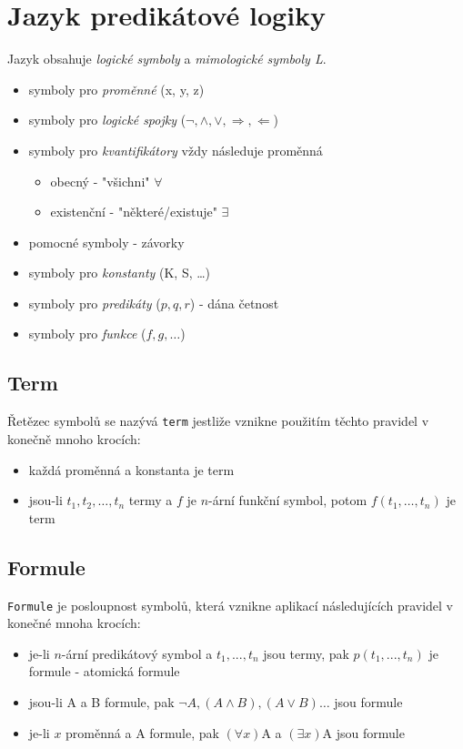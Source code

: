 \documentclass{szzclass}
\begin{document}
\tableofcontents
\newpage

\section{Jazyk predikátové logiky}
Jazyk obsahuje \textit{logické symboly} a \textit{mimologické symboly L}.
\begin{itemize}
  \item symboly pro \textit{proměnné} (x, y, z)
  \item symboly pro \textit{logické spojky} ($\neg, \wedge, \vee, \Rightarrow, \Leftarrow$)
  \item symboly pro \textit{kvantifikátory} vždy následuje proměnná
  \begin{itemize}
    \item obecný - "všichni" $\forall$
    \item existenční - "některé/existuje" $\exists$
  \end{itemize}
  \item pomocné symboly - závorky
  \item symboly pro \textit{konstanty} (K, S, \dots)
  \item symboly pro \textit{predikáty} ($p, q, r$) - dána četnost
  \item symboly pro \textit{funkce} ($f, g, \dots$)
\end{itemize}
\subsection{Term}
Řetězec symbolů se nazývá \texttt{term} jestliže vznikne použitím těchto pravidel v konečně mnoho krocích:
\begin{itemize}
  \item každá proměnná a konstanta je term
  \item jsou-li $t_1, t_2,\dots,t_n$ termy a $f$ je $n$-ární funkční symbol, potom $f(t_1,\dots,t_n)$ je term
\end{itemize}
\subsection{Formule}
\texttt{Formule} je posloupnost symbolů, která vznikne aplikací následujících pravidel v konečné mnoha krocích:
\begin{itemize}
  \item je-li $n$-ární predikátový symbol a $t_1,...,t_n$ jsou termy, pak $p(t_1,...,t_n)$ je formule - atomická formule
  \item jsou-li A a B formule, pak $\neg A, (A \wedge B), (A \vee B)\dots$ jsou formule
  \item je-li $x$ proměnná a A formule, pak $(\forall{x})$A a $(\exists{x})$A jsou formule
\end{itemize}
\end{document}
